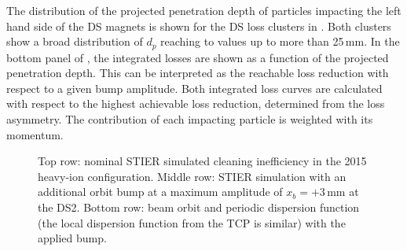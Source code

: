 The distribution of the projected penetration depth of particles impacting the left hand side of the DS magnets is shown for the DS loss clusters in . Both clusters show a broad distribution of $d_p$ reaching to values up to more than 25$\,$mm. In the bottom panel of , the integrated losses are shown as a function of the projected penetration depth. This can be interpreted as the reachable loss reduction with respect to a given bump amplitude. Both integrated loss curves are calculated with respect to the highest achievable loss reduction, determined from the loss asymmetry. The contribution of each impacting particle is weighted with its momentum.





\begin{figure}[t]
  \centering
  \caption{Top row: nominal STIER simulated cleaning inefficiency in the 2015 heavy-ion configuration. Middle row: STIER simulation with an additional orbit bump at a maximum amplitude of $x_b=+3\,$mm at the DS2. Bottom row: beam orbit and periodic dispersion function (the local dispersion function from the TCP is similar) with the applied bump.}  
  \label{pic:16052701}
  \end{figure}

